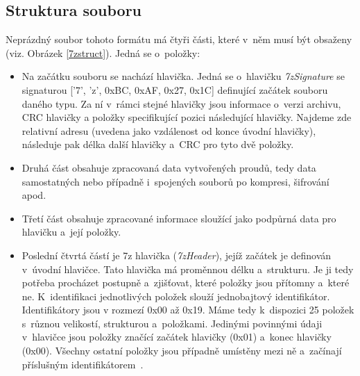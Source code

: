 \subsection{Struktura souboru}
\label{ssec:7z_struct}
Neprázdný soubor tohoto formátu má čtyři části, které v~něm musí být obsaženy (viz. Obrázek
\ref{7zstruct}). Jedná se o~položky: 
\begin{itemize}
    \item Na začátku souboru se nachází hlavička. Jedná se o~hlavičku {\it 7zSignature} se
	signaturou ['7', 'z', 0xBC, 0xAF, 0x27, 0x1C] definující začátek souboru daného typu.
	Za ní v~rámci stejné hlavičky jsou informace o~verzi archivu, CRC hlavičky a položky
	specifikující pozici následující hlavičky. Najdeme zde relativní adresu (uvedena jako
	vzdálenost od konce úvodní hlavičky), následuje pak délka další hlavičky a~CRC pro tyto dvě
	položky.
    \item Druhá část obsahuje zpracovaná data vytvořených proudů, tedy data samostatných nebo
	případně i~spojených souborů po kompresi, šifrování apod.
    \item Třetí část obsahuje zpracované informace sloužící jako podpůrná data pro hlavičku a~její
	položky.
    \item Poslední čtvrtá částí je 7z hlavička ({\it 7zHeader}), jejíž začátek je definován
	v~úvodní hlavičce. Tato hlavička má proměnnou délku a~strukturu. Je ji tedy potřeba
	procházet postupně a~zjišťovat, které položky jsou přítomny a~které ne. K~identifikaci
	jednotlivých položek slouží jednobajtový identifikátor. Identifikátory jsou v rozmezí 0x00
	až 0x19. Máme tedy k~dispozici 25 položek s~různou velikostí, strukturou a~položkami.
	Jedinými povinnými údaji v~hlavičce jsou položky značící začátek hlavičky (0x01) a~konec
	hlavičky (0x00). Všechny ostatní položky jsou případně umístěny mezi ně a~začínají
	příslušným identifikátorem~\cite{Pavlov:2010}. 
\end{itemize}
